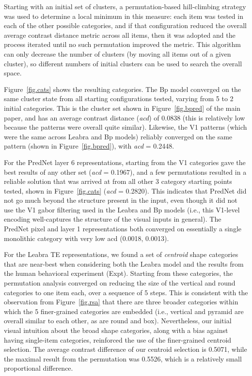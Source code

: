 Starting with an initial set of clusters, a permutation-based hill-climbing strategy was used to determine a local minimum in this measure: each item was tested in each of the other possible categories, and if that configuration reduced the overall average contrast distance metric across all items, then it was adopted and the process iterated until no such permutation improved the metric.  This algorithm can only decrease the number of clusters (by moving all items out of a given cluster), so different numbers of initial clusters can be used to search the overall space.

Figure~\ref{fig.cats} shows the resulting categories. The Bp model converged on the same cluster state from all starting configurations tested, varying from 5 to 2 initial categories.  This is the cluster set shown in Figure~\ref{fig.bpred} of the main paper, and has an average contrast distance ({\em acd}) of 0.0838 (this is relatively low because the patterns were overall quite similar).  Likewise, the V1 patterns (which were the same across Leabra and Bp models) reliably converged on the same pattern (shown in Figure~\ref{fig.bpred}), with {\em acd} = 0.2448.

For the PredNet layer 6 representations, starting from the V1 categories gave the best results of any other set ({\em acd} = 0.1967), and a few permutations resulted in a reliable solution that was arrived at from all other 3 category starting points tested, shown in Figure~\ref{fig.cats} ({\em acd} = 0.2820).  This indicates that PredNet did not go much beyond the structure present in the input, even though it did not use the V1 gabor filtering used in the Leabra and Bp models (i.e., this V1-level encoding well-captures the structure of the visual inputs in general).  The PredNet pixel and layer 1 representations both converged on essentially a single monolithic category with very low acd (0.0018, 0.0013).

For the Leabra TE representations, we found a set of {\em centroid} shape categories that are near-best when considering both the Leabra model and the results from the human behavioral experiment (Expt).  Starting from these categories, the permutation analysis converged on reducing the size of the vertical and round categories to one item each, over a sequence of 5 steps.  This is consistent with the observation from Figure~\ref{fig.rsa} that there are three broader categories within which the 5 finer-grained categories are embedded (i.e., vertical and pyramid are overall similar to each other, as are round and box).  Nevertheless, our initial visual intuition about the broad shape categories, along with a bias against having single-item categories, reinforced the use of the finer-grained centroid selection.  The average contrast difference of our centroid selection is 0.5071, while the maximal result from the permutation was 0.5526, which is a relatively small proportional difference.

